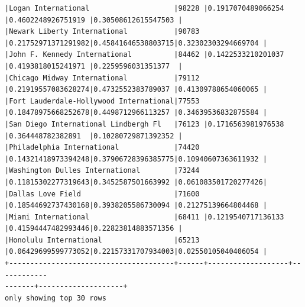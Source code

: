 \documentclass[11pt]{article}
\begin{document}
\begin{Verbatim}[commandchars=\\\{\}]
|Logan International                    |98228 |0.1917070489066254
|0.4602248926751919 |0.30508612615547503 |
|Newark Liberty International           |90783
|0.21752971371291982|0.45841646538803715|0.32302303294669704 |
|John F. Kennedy International          |84462 |0.1422533210201037
|0.4193818015241971 |0.2259596031351377  |
|Chicago Midway International           |79112
|0.21919557083628274|0.4732552383789037 |0.41309788654060065 |
|Fort Lauderdale-Hollywood International|77553
|0.18478975668252678|0.4498712966113257 |0.34639536832875584 |
|San Diego International Lindbergh Fl   |76123 |0.1716563981976538
|0.364448782382891  |0.10280729871392352 |
|Philadelphia International             |74420
|0.14321418973394248|0.37906728396385775|0.10940607363611932 |
|Washington Dulles International        |73244
|0.11815302277319643|0.3452587501663992 |0.061083501720277426|
|Dallas Love Field                      |71600
|0.18544692737430168|0.3938205586730094 |0.21275139664804468 |
|Miami International                    |68411 |0.1219540717136133
|0.41594447482993446|0.22823814883571356 |
|Honolulu International                 |65213
|0.06429699599773052|0.22157331707934003|0.02550105040406054 |
+---------------------------------------+------+-------------------+------------
-------+--------------------+
only showing top 30 rows

    \end{Verbatim}

    \begin{Verbatim}[commandchars=\\\{\}]

    \end{Verbatim}
\end{document}

